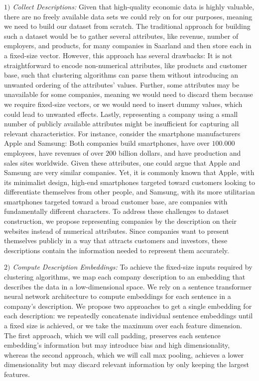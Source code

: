 \documentclass[conference]{IEEEtran}
\newcommand{\pe}[1]{\todo[inline, backgroundcolor=green]{PE: #1}}
\begin{document}
\textit{$1)$ Collect Descriptions:} Given that high-quality economic data is highly valuable, there are no freely available data sets we could rely on for our purposes, meaning we need to build our dataset from scratch. \pe{TODO: rephrase} The traditional approach for building such a dataset would be to gather several attributes, like revenue, number of employers, and products, for many companies in Saarland and then store each in a fixed-size vector. \pe{TODO: backup with accepted approach} However, this approach has several drawbacks: It is not straightforward to encode non-numerical attributes, like products and customer base, such that clustering algorithms can parse them without introducing an unwanted ordering of the attributes' values. Further, some attributes may be unavailable for some companies, meaning we would need to discard them because we require fixed-size vectors, or we would need to insert dummy values, which could lead to unwanted effects. Lastly, representing a company using a small number of publicly available attributes might be insufficient for capturing all relevant characteristics. For instance, consider the smartphone manufacturers Apple and Samsung: Both companies build smartphones, have over $100.000$ employees, have revenues of over $200$ billion dollars, and have production and sales sites worldwide. Given these attributes, one could argue that Apple and Samsung are very similar companies. Yet, it is commonly known that Apple, with its minimalist design, high-end smartphones targeted toward customers looking to differentiate themselves from other people, and Samsung, with its more utilitarian smartphones targeted toward a broad customer base, are companies with fundamentally different characters.
To address these challenges to dataset construction, we propose representing companies by the description on their websites instead of numerical attributes. Since companies want to present themselves publicly in a way that attracts customers and investors, these descriptions contain the information needed to represent them accurately. 

\textit{$2)$ Compute Description Embeddings:} To achieve the fixed-size inputs required by clustering algorithms, we map each company description to an embedding that describes the data in a low-dimensional space. We rely on a sentence transformer neural network architecture to compute embeddings for each sentence in a company's description. We propose two approaches to get a single embedding for each description: we repeatedly concatenate individual sentence embeddings until a fixed size is achieved, or we take the maximum over each feature dimension. The first approach, which we will call padding, preserves each sentence embedding's information but may introduce bias and high dimensionality, whereas the second approach, which we will call max pooling, achieves a lower dimensionality but may discard relevant information by only keeping the largest features.
\end{document}
